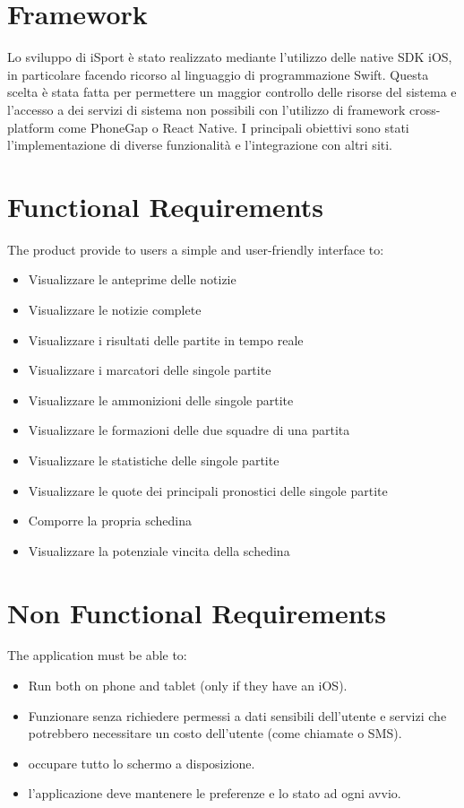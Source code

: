 \documentclass[numbers=noenddot, 12pt, a4paper, oneside]{scrbook}
\begin{document}
\section{Framework}
Lo sviluppo di iSport è stato realizzato mediante l'utilizzo delle native SDK iOS, in particolare facendo ricorso al linguaggio di programmazione Swift. Questa scelta è stata fatta per permettere un maggior controllo delle risorse del sistema e l'accesso a dei servizi di sistema non possibili con l'utilizzo di framework cross-platform come PhoneGap o React Native. I principali obiettivi sono stati l'implementazione di diverse funzionalità e l'integrazione con altri siti.

\section{Functional Requirements}
The product provide to users a simple and user-friendly interface to:
\begin{itemize}
	\item Visualizzare le anteprime delle notizie
	\item Visualizzare le notizie complete
	\item Visualizzare i risultati delle partite in tempo reale
	\item Visualizzare i marcatori delle singole partite
	\item Visualizzare le ammonizioni delle singole partite
	\item Visualizzare le formazioni delle due squadre di una partita
	\item Visualizzare le statistiche delle singole partite
	\item Visualizzare le quote dei principali pronostici delle singole partite
	\item Comporre la propria schedina
	\item Visualizzare la potenziale vincita della schedina
\end{itemize}
\section{Non Functional Requirements}
The application must be able to:
\begin{itemize}
	\item Run both on phone and tablet (only if they have an iOS).
	\item Funzionare senza richiedere permessi a dati sensibili dell'utente e servizi che potrebbero necessitare un costo dell'utente (come chiamate o SMS).
	\item occupare tutto lo schermo a disposizione.
	\item l'applicazione deve mantenere le preferenze e lo stato ad ogni avvio.
\end{itemize}
\end{document}
